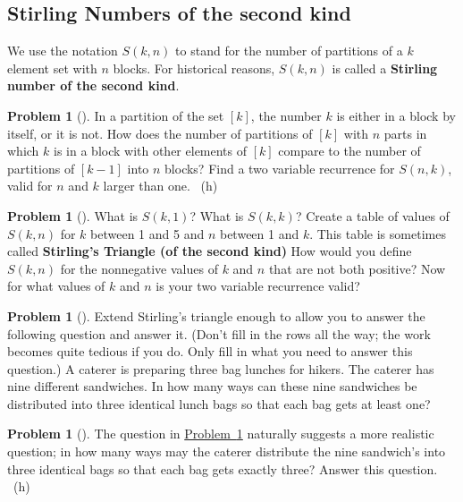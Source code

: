 \documentclass[10pt,]{book}
\newcommand{\terminology}[1]{\textbf{#1}}
\theoremstyle{plain}
\theoremstyle{definition}
\newtheorem{activity}[project]{Problem}
\theoremstyle{definition}
\numberwithin{equation}{chapter}
\begin{document}
\subsection[{Stirling Numbers of the second kind}]{Stirling Numbers of the second kind}\label{subsection-33}
\hypertarget{p-795}{}%
We use the notation \(S(k,n)\) to stand for the number of partitions of a \(k\) element set with \(n\) blocks. For historical reasons, \(S(k,n)\) is called a \terminology{Stirling number of the second kind}. %
\begin{activity}[]\marginsymbol[-1em]{} \label{secondstirlingrecurrence}
\hypertarget{p-796}{}%
In a partition of the set \([k]\), the number \(k\) is either in a block by itself, or it is not. How does the number of partitions of \([k]\) with \(n\) parts in which \(k\) is in a block with other elements of \([k]\) compare to the number of partitions of \([k-1]\) into \(n\) blocks? Find a two variable recurrence for \(S(n,k)\), valid for \(n\) and \(k\) larger than one.%
~{\tiny (h)}\end{activity}
\begin{activity}[]\marginsymbol[-1em]{} \label{activity-135}
\hypertarget{p-799}{}%
What is \(S(k,1)\)? What is \(S(k,k)\)? Create a table of values of \(S(k,n)\) for \(k\) between 1 and 5 and \(n\) between 1 and \(k\). This table is sometimes called \terminology{Stirling's Triangle (of the second kind)} How would you define \(S(k,n)\) for the nonnegative values of \(k\) and \(n\) that are not both positive? Now for what values of \(k\) and \(n\) is your two variable recurrence valid?%
\end{activity}
\begin{activity}[]\marginsymbol[-1em]{} \label{sandwiches}
\hypertarget{p-802}{}%
Extend Stirling's triangle enough to allow you to answer the following question and answer it. (Don't fill in the rows all the way; the work becomes quite tedious if you do. Only fill in what you need to answer this question.) A caterer is preparing three bag lunches for hikers. The caterer has nine different sandwiches. In how many ways can these nine sandwiches be distributed into three identical lunch bags so that each bag gets at least one?%
\end{activity}
\begin{activity}[]\marginsymbol[-1em]{} \label{caterer2}
\hypertarget{p-804}{}%
The question in \hyperref[sandwiches]{Problem~\ref{sandwiches}} naturally suggests a more realistic question; in how many ways may the caterer distribute the nine sandwich's into three identical bags so that each bag gets exactly three? Answer this question.%
~{\tiny (h)}\end{activity}
\end{document}
